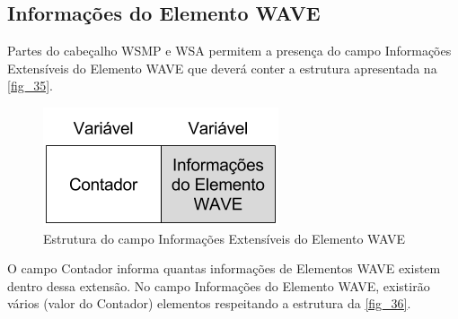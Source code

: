 \documentclass[
12pt,				%
openright,			%
oneside,			%
a4paper,			%
brazil,				%
]{abntex2}
\begin{document}
{\begin{anexosenv}
		
		
		
		
		
		
		
	    \chapter{\label{att:InfoElemWAVE}Informações do Elemento WAVE}
	
	    \par Partes do cabeçalho WSMP e WSA permitem a presença do campo Informações Extensíveis do Elemento WAVE que deverá conter a estrutura apresentada na \autoref{fig_35}.
	
	    \begin{figure} [H]
		    \centering
		    \includegraphics[scale=.5]{figuras/cap3/35EstruturaElementoWAVE}
		    \caption{\label{fig_35}Estrutura do campo Informações Extensíveis do Elemento WAVE}
	    \end{figure}
	
	    \par O campo Contador informa quantas informações de Elementos WAVE existem dentro dessa extensão. No campo Informações do Elemento WAVE, existirão vários (valor do Contador) elementos respeitando a estrutura da \autoref{fig_36}.
	

\end{anexosenv}}
\end{document}
